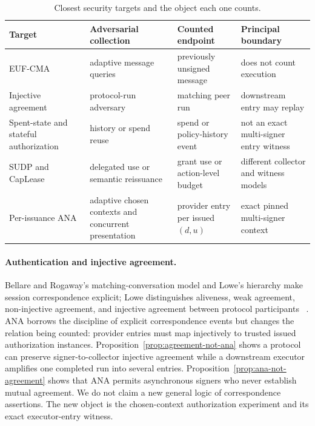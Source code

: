 \documentclass[10pt]{article}
\begin{document}
\begin{table}[ht]
\centering
\caption{Closest security targets and the object each one counts.}
\label{tab:closest-work}
\small
\begin{tabularx}{\textwidth}{@{}>{\raggedright\arraybackslash}p{}>{\raggedright\arraybackslash}p{}>{\raggedright\arraybackslash}p{}>{\raggedright\arraybackslash}X@{}}
\toprule
Target & Adversarial collection & Counted endpoint & Principal boundary \\
\midrule
EUF-CMA~\cite{gmr88} & adaptive message queries & previously unsigned message & does not count execution \\
Injective agreement~\cite{lowe97} & protocol-run adversary & matching peer run & downstream entry may replay \\
Spent-state and stateful authorization~\cite{chaumcash90,statefulauth} & history or spend reuse & spend or policy-history event & not an exact multi-signer entry witness \\
SUDP and CapLease~\cite{sudp26,caplease26} & delegated use or semantic reissuance & grant use or action-level budget & different collector and witness models \\
Per-issuance ANA & adaptive chosen contexts and concurrent presentation & provider entry per issued $(d,u)$ & exact pinned multi-signer context \\
\bottomrule
\end{tabularx}
\normalsize
\end{table}

\paragraph{Authentication and injective agreement.}
Bellare and Rogaway's matching-conversation model and Lowe's hierarchy make
session correspondence explicit; Lowe distinguishes aliveness, weak agreement,
non-injective agreement, and injective agreement between protocol participants
~\cite{bellarerogaway93,lowe97}.
ANA borrows the discipline of explicit correspondence events but changes the
relation being counted: provider entries must map injectively to trusted issued
authorization instances. Proposition~\ref{prop:agreement-not-ana} shows a protocol can preserve
signer-to-collector injective agreement while a downstream executor amplifies
one completed run into several entries. Proposition~\ref{prop:ana-not-agreement} shows that ANA permits
asynchronous signers who never establish mutual agreement. We do not claim a
new general logic of correspondence assertions. The new object is the
chosen-context authorization experiment and its exact executor-entry witness.
\end{document}
